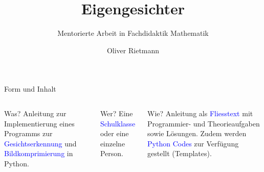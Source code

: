 \documentclass[10pt,aspectratio=169]{beamer}
\title{Eigengesichter}
\subtitle{Mentorierte Arbeit in Fachdidaktik Mathematik}
\date{}
\author{Oliver Rietmann}
\institute{ETH Zürich}
\begin{document}
	
\maketitle


\begin{frame}[fragile]{Form und Inhalt} 	
	\begin{columns}[T,onlytextwidth]
		\column{\textwidth}
		\begin{block}{Was?}
			Anleitung zur Implementierung eines Programms zur \textcolor{blue}{Gesichtserkennung} und \textcolor{blue}{Bildkomprimierung} in Python.
		\end{block}
		\vspace{0.2cm}\pause
		\begin{block}{Wer?}
			Eine \textcolor{blue}{Schulklasse} oder eine einzelne Person.
		\end{block}
		\vspace{0.2cm}\pause
		\begin{block}{Wie?}
			Anleitung als \textcolor{blue}{Fliesstext} mit Programmier- und Theorieaufgaben sowie Lösungen.
			Zudem werden \textcolor{blue}{Python Codes} zur Verfügung gestellt (Templates).
		\end{block}
	\end{columns}	
\end{frame}
\end{document}
